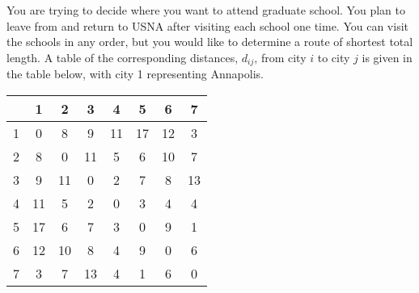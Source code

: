 \documentclass[12pt]{exam}
\begin{document}
\begin{questions}
\begin{parts}
\end{parts}

\question You are trying to decide where you want to attend graduate school.  You plan to leave from and return to USNA after visiting each school one time.  You can visit the schools in any order, but you would like to determine a route of shortest total length.  A table of the corresponding distances, $d_{ij}$, from city $i$ to city $j$ is given in the  table below, with city 1 representing Annapolis.

\begin{center}
\begin{tabular}{l||c|c|c|c|c|c|c}
  & 1 & 2 & 3 & 4 & 5 & 6 & 7  \\
\hline
\hline
1   & 0 & 8 & 9 & 11 & 17 & 12 & 3 \\
\hline
2  & 8 & 0 & 11 & 5 & 6 & 10 & 7 \\
\hline
3  & 9 & 11 & 0 & 2 & 7 & 8 & 13 \\
\hline
4  & 11 & 5 & 2 & 0 & 3  & 4 & 4 \\
\hline
5  & 17 & 6 & 7 & 3 & 0  & 9 & 1 \\
\hline
6  & 12 & 10 & 8 & 4 & 9 & 0  & 6 \\
\hline
7  & 3  & 7 & 13 & 4 & 1 & 6 & 0\\
\hline
\end{tabular}
\end{center}

%
%
%
%
\begin{parts}

\end{parts}
\end{questions}
\end{document}
